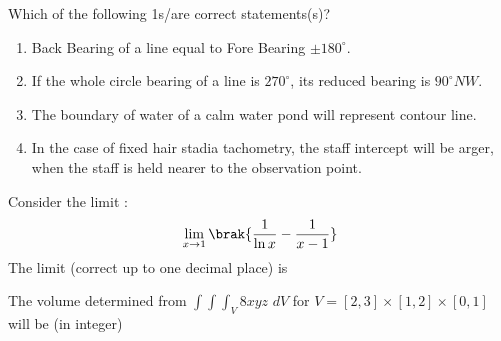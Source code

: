 \iffalse
\title{Assignment11}
\author{ee24btech11064}
\chapter{2021}
\section{ce}
\fi

\item Which of the following 1s/are correct statements(s)?
\begin{enumerate}
    \item Back Bearing of a line equal to Fore Bearing $\pm 180^\circ$.
    \item If the whole circle bearing of a line is $270^\circ$, its reduced bearing is $90^\circ NW$.
    \item The boundary of water of a calm water pond will represent contour line.
    \item In the case of fixed hair stadia tachometry, the staff intercept will be arger, when the staff is held nearer to the observation point.
\end{enumerate}
\item Consider the limit :
\begin{align*}
    \lim_{x\rightarrow 1}\brak{\frac{1}{\ln{x}}-\frac{1}{x-1}}
\end{align*}
The limit (correct up to one decimal place) is \underline{\hspace{1cm}} 
\vspace{0.5cm}

\item The volume determined from $\int\int\int_{V} 8xyz$ $dV$ for $V=[2,3]\times[1,2]\times[0,1]$ will be (in integer) \underline{\hspace{1cm}} 


